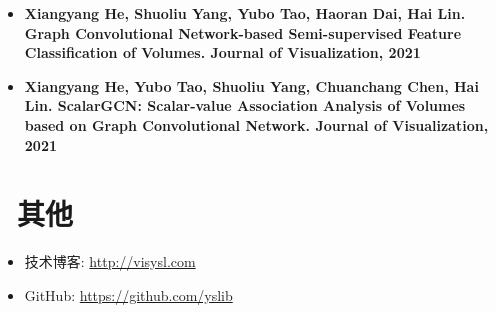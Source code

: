 \documentclass{resume}
\begin{document}
\begin{itemize}

\item \textbf{Xiangyang He, Shuoliu Yang, Yubo Tao, Haoran Dai, Hai Lin. Graph Convolutional Network-based Semi-supervised Feature Classification of Volumes. Journal of Visualization, 2021}
\item \textbf{Xiangyang He, Yubo Tao, Shuoliu Yang, Chuanchang Chen, Hai Lin. ScalarGCN: Scalar-value Association Analysis of Volumes based on Graph Convolutional Network. Journal of Visualization, 2021}

\end{itemize}

\section{\faInfo\ 其他}
\begin{itemize}[parsep=0.5ex]
  \item 技术博客: \url{http://visysl.com}
  \item GitHub: \url{https://github.com/yslib}
\end{itemize}
\end{document}
